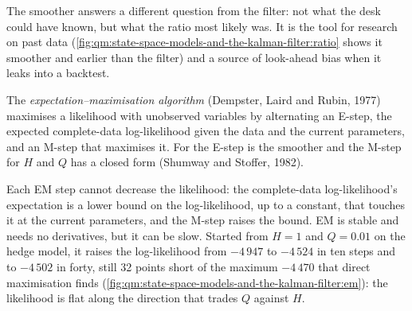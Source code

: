 The smoother answers a different question from the filter: not what the desk could have known, but what the ratio most likely was. It is the tool for
research on past data (\cref{fig:qm:state-space-models-and-the-kalman-filter:ratio} shows it smoother and earlier than the filter) and a source of look-ahead
bias when it leaks into a backtest.

\begin{definition}\label{def:qm:state-space-models-and-the-kalman-filter:em}
The \emph{expectation--maximisation algorithm} (Dempster, Laird and Rubin, 1977) maximises a likelihood with
unobserved variables by alternating an E-step, the expected complete-data log-likelihood given the data and the current parameters, and an M-step that
maximises it. For  the E-step is the smoother and the M-step for $H$ and $Q$ has a closed form (Shumway and Stoffer, 1982).
\end{definition}

Each EM step cannot decrease the likelihood: the complete-data log-likelihood's expectation is a lower bound on the log-likelihood, up to a constant, that
touches it at the current parameters, and the M-step raises the bound. EM is stable and needs no derivatives, but it can be slow. Started from $H = 1$ and $Q =
0.01$ on the hedge model, it raises the log-likelihood from $-4\,947$ to $-4\,524$ in ten steps and to $-4\,502$ in forty, still 32 points short of the maximum
$-4\,470$ that direct maximisation finds (\cref{fig:qm:state-space-models-and-the-kalman-filter:em}): the likelihood is flat along the direction that trades $Q$
against $H$.

\begin{omfigure}

\label{fig:qm:state-space-models-and-the-kalman-filter:em}
\end{omfigure}

